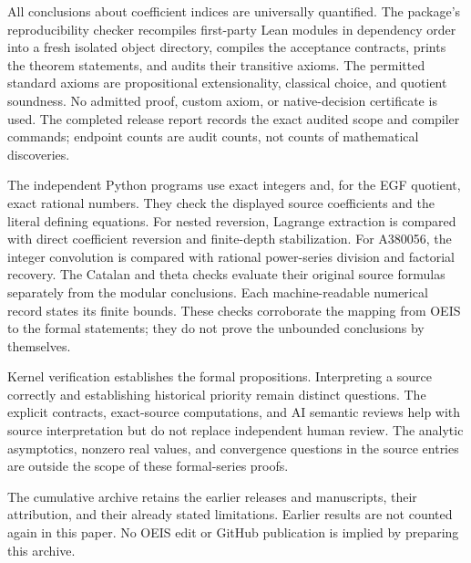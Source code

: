 \documentclass[11pt,a4paper]{article}
\theoremstyle{remark}
\begin{document}
All conclusions about coefficient indices are universally quantified.
The package's reproducibility checker recompiles first-party Lean
modules in dependency order into a fresh isolated object directory,
compiles the acceptance contracts, prints the theorem statements, and
audits their transitive axioms. The permitted standard axioms are
propositional extensionality, classical choice, and quotient soundness.
No admitted proof, custom axiom, or native-decision certificate is used.
The completed release report records the exact audited scope and
compiler commands; endpoint counts are audit counts, not counts of
mathematical discoveries.

The independent Python programs use exact integers and, for the EGF
quotient, exact rational numbers. They check the displayed source
coefficients and the literal defining equations. For nested reversion,
Lagrange extraction is compared with direct coefficient reversion and
finite-depth stabilization. For A380056, the integer convolution is
compared with rational power-series division and factorial recovery.
The Catalan and theta checks evaluate their original source formulas
separately from the modular conclusions. Each machine-readable numerical
record states its finite bounds. These checks corroborate the mapping
from OEIS to the formal statements; they do not prove the unbounded
conclusions by themselves.

Kernel verification establishes the formal propositions. Interpreting a
source correctly and establishing historical priority remain distinct
questions. The explicit contracts, exact-source computations, and AI
semantic reviews help with source interpretation but do not replace
independent human review. The analytic asymptotics, nonzero real values,
and convergence questions in the source entries are outside the scope of
these formal-series proofs.

The cumulative archive retains the earlier releases and manuscripts,
their attribution, and their already stated limitations. Earlier results
are not counted again in this paper. No OEIS edit or GitHub publication
is implied by preparing this archive.
\end{document}
